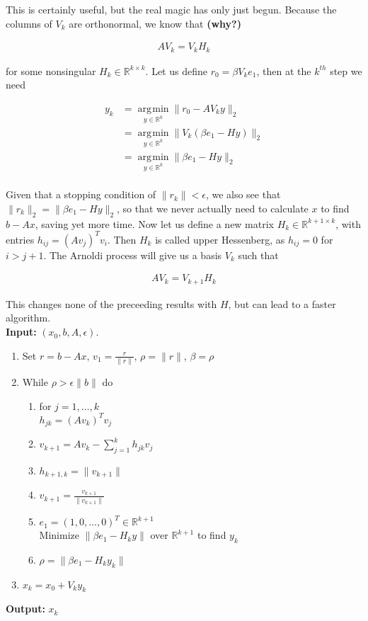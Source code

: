 \documentclass[11pt]{article}
\DeclareMathOperator*{\argmin}{\arg\!\min}
\begin{document}
This is certainly useful, but the real magic has only just begun. Because the columns of $V_k$ are orthonormal, we know that \textbf{(why?)}

\begin{align*}
  AV_k = V_k H_k
\end{align*}

for some nonsingular $H_k \in \mathbb{R}^{k \times k}$. Let us define $r_0 = \beta V_k e_1$, then at the $k^{th}$ step we need

\begin{align*}
  y_k &= \argmin \limits_{y \in \mathbb{R}^k} \| r_0 - A V_k y\|_2 \\
  &= \argmin \limits_{y \in \mathbb{R}^k} \| V_k( \beta e_1 - H y)\|_2 \\
  &= \argmin \limits_{y \in \mathbb{R}^k} \| \beta e_1 - H y\|_2 \\
\end{align*}

Given that a stopping condition of $\| r_k \| < \epsilon$, we also see that $\| r_k \|_2 = \| \beta e_1 - H y\|_2$, so that we never actually need to calculate $x$ to find $b - Ax$, saving yet more time. Now let us define a new matrix $H_k \in \mathbb{R}^{k+1 \times k}$, with entries $h_{ij} = (Av_j)^Tv_i$. Then $H_k$ is called upper Hessenberg, as $h_{ij} = 0$ for $i > j + 1$. The Arnoldi process will give us a basis $V_k$ such that

\begin{align*}
  A V_k = V_{k+1} H_k
\end{align*}

This changes none of the preceeding results with $H$, but can lead to a faster algorithm. \\

\textbf{Input:} $(x_0, b, A, \epsilon)$.
\begin{enumerate}
\item Set $r = b - Ax$, $v_1 = \frac{r}{\| r \|}$, $\rho = \| r \|$, $\beta = \rho$
\item While $\rho > \epsilon \| b \|$ do
  \begin{enumerate}
  \item for $j = 1, \dots, k$ \\
    $h_{jk} = (A v_k)^T v_j$
  \item $v_{k+1} = A v_k - \sum \limits_{j=1}^k h_{jk} v_j$
  \item $h_{k+1,k} = \| v_{k+1} \|$
  \item $ v_{k+1} = \frac{v_{k+1}}{\| v_{k+1} \|}$
  \item $e_1 = (1, 0,\dots, 0)^T \in \mathbb{R}^{k+1}$ \\
    Minimize $\| \beta e_1 - H_k y \|$ over $\mathbb{R}^{k+1}$ to find $y_k$
  \item $\rho = \| \beta e_1 - H_k y_k \|$
\end{enumerate}
\item $x_k = x_0 + V_k y_k$
\end{enumerate}
\textbf{Output:} $x_k$ \\
\end{document}
